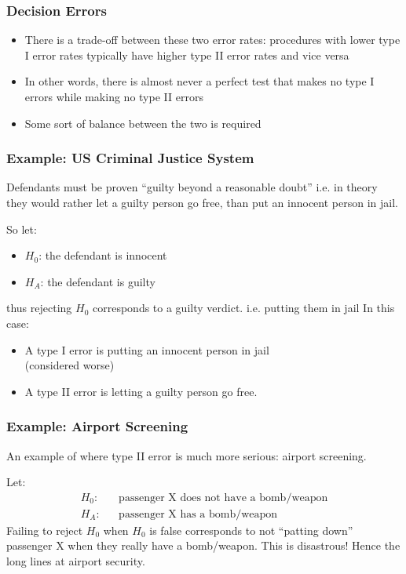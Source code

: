 \documentclass[handout]{beamer}
\newcommand{\blue}[1]{\textcolor{blue2}{#1}}
\begin{document}
\begin{frame}
\frametitle{Decision Errors}
\begin{itemize}
\item There is a trade-off between these two error rates: procedures with lower type I error rates typically have higher type II error rates and vice versa
\pause \item In other words, there is almost never a perfect test that makes no type I errors while making no type II errors
\pause \item Some sort of balance between the two is required
\end{itemize}
\end{frame}


\begin{frame}
\frametitle{Example:  US Criminal Justice System}
Defendants must be proven ``guilty beyond a reasonable doubt''  i.e. \blue{in theory} they would rather let a guilty person go free, than put an innocent person in jail.

\vskip 0.25cm
\pause So let:
\begin{itemize}
\item $H_0$: the defendant is innocent
\item $H_A$: the defendant is guilty
\end{itemize}
\pause thus rejecting $H_0$ corresponds to a guilty verdict.  i.e. putting them in jail
\vskip 0.25cm
\pause In this case:
\begin{itemize}
\item A type I error is putting an innocent person in jail\\
(considered worse)
\item A type II error is letting a guilty person go free.  
\end{itemize}
\end{frame}


\begin{frame}
\frametitle{Example:  Airport Screening}
An example of where type II error is much more serious:  \blue{airport screening}.  

\vskip 0.25cm
\pause Let:
\begin{eqnarray*}
H_0: && \mbox{passenger X does not have a bomb/weapon}\\
H_A: && \mbox{passenger X has a bomb/weapon}
\end{eqnarray*}
\pause Failing to reject $H_0$ when $H_0$ is false corresponds to not ``patting down'' passenger X when they really have a bomb/weapon.  This is disastrous!
\vskip 0.25cm
\pause Hence the long lines at airport security.  
\end{frame}
\end{document}
